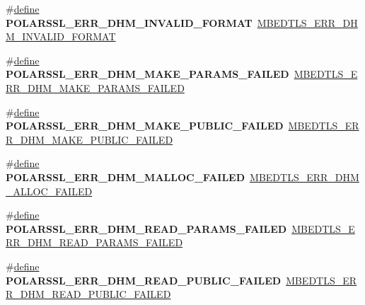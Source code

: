 \begin{DoxyCompactItemize}
\#\hyperlink{structdefine}{define} {\bfseries P\+O\+L\+A\+R\+S\+S\+L\+\_\+\+E\+R\+R\+\_\+\+D\+H\+M\+\_\+\+I\+N\+V\+A\+L\+I\+D\+\_\+\+F\+O\+R\+M\+AT}~\hyperlink{dhm_8h_acfa4b3662afd1101c37e07e36b535da3}{M\+B\+E\+D\+T\+L\+S\+\_\+\+E\+R\+R\+\_\+\+D\+H\+M\+\_\+\+I\+N\+V\+A\+L\+I\+D\+\_\+\+F\+O\+R\+M\+AT}
\item 
\mbox{\label{compat-1_83_8h_a3e27f309924f0bf267c7de08bc6125b5}} 
\#\hyperlink{structdefine}{define} {\bfseries P\+O\+L\+A\+R\+S\+S\+L\+\_\+\+E\+R\+R\+\_\+\+D\+H\+M\+\_\+\+M\+A\+K\+E\+\_\+\+P\+A\+R\+A\+M\+S\+\_\+\+F\+A\+I\+L\+ED}~\hyperlink{dhm_8h_a14e2cef69f706b669ff97924d9f0c393}{M\+B\+E\+D\+T\+L\+S\+\_\+\+E\+R\+R\+\_\+\+D\+H\+M\+\_\+\+M\+A\+K\+E\+\_\+\+P\+A\+R\+A\+M\+S\+\_\+\+F\+A\+I\+L\+ED}
\item 
\mbox{\label{compat-1_83_8h_a29ed83b8442b715e03990f438d4bce98}} 
\#\hyperlink{structdefine}{define} {\bfseries P\+O\+L\+A\+R\+S\+S\+L\+\_\+\+E\+R\+R\+\_\+\+D\+H\+M\+\_\+\+M\+A\+K\+E\+\_\+\+P\+U\+B\+L\+I\+C\+\_\+\+F\+A\+I\+L\+ED}~\hyperlink{dhm_8h_a4f6a753b182c2967f4c461d35cd00af3}{M\+B\+E\+D\+T\+L\+S\+\_\+\+E\+R\+R\+\_\+\+D\+H\+M\+\_\+\+M\+A\+K\+E\+\_\+\+P\+U\+B\+L\+I\+C\+\_\+\+F\+A\+I\+L\+ED}
\item 
\mbox{\label{compat-1_83_8h_ac3d150ca9ea33ba5355738f56907907c}} 
\#\hyperlink{structdefine}{define} {\bfseries P\+O\+L\+A\+R\+S\+S\+L\+\_\+\+E\+R\+R\+\_\+\+D\+H\+M\+\_\+\+M\+A\+L\+L\+O\+C\+\_\+\+F\+A\+I\+L\+ED}~\hyperlink{dhm_8h_ab41c35f09ac9121671a51d057d06d726}{M\+B\+E\+D\+T\+L\+S\+\_\+\+E\+R\+R\+\_\+\+D\+H\+M\+\_\+\+A\+L\+L\+O\+C\+\_\+\+F\+A\+I\+L\+ED}
\item 
\mbox{\label{compat-1_83_8h_a1cf5b743957392157fefae2d1ceef39f}} 
\#\hyperlink{structdefine}{define} {\bfseries P\+O\+L\+A\+R\+S\+S\+L\+\_\+\+E\+R\+R\+\_\+\+D\+H\+M\+\_\+\+R\+E\+A\+D\+\_\+\+P\+A\+R\+A\+M\+S\+\_\+\+F\+A\+I\+L\+ED}~\hyperlink{dhm_8h_aeda9c1e986e7602a7aecd7aab670c765}{M\+B\+E\+D\+T\+L\+S\+\_\+\+E\+R\+R\+\_\+\+D\+H\+M\+\_\+\+R\+E\+A\+D\+\_\+\+P\+A\+R\+A\+M\+S\+\_\+\+F\+A\+I\+L\+ED}
\item 
\mbox{\label{compat-1_83_8h_a54e3f55659f632b8cce3159f113ee009}} 
\#\hyperlink{structdefine}{define} {\bfseries P\+O\+L\+A\+R\+S\+S\+L\+\_\+\+E\+R\+R\+\_\+\+D\+H\+M\+\_\+\+R\+E\+A\+D\+\_\+\+P\+U\+B\+L\+I\+C\+\_\+\+F\+A\+I\+L\+ED}~\hyperlink{dhm_8h_a8e6f0e88a0c1865c8d4cbe576ee7a5fb}{M\+B\+E\+D\+T\+L\+S\+\_\+\+E\+R\+R\+\_\+\+D\+H\+M\+\_\+\+R\+E\+A\+D\+\_\+\+P\+U\+B\+L\+I\+C\+\_\+\+F\+A\+I\+L\+ED}

\end{DoxyCompactItemize}
